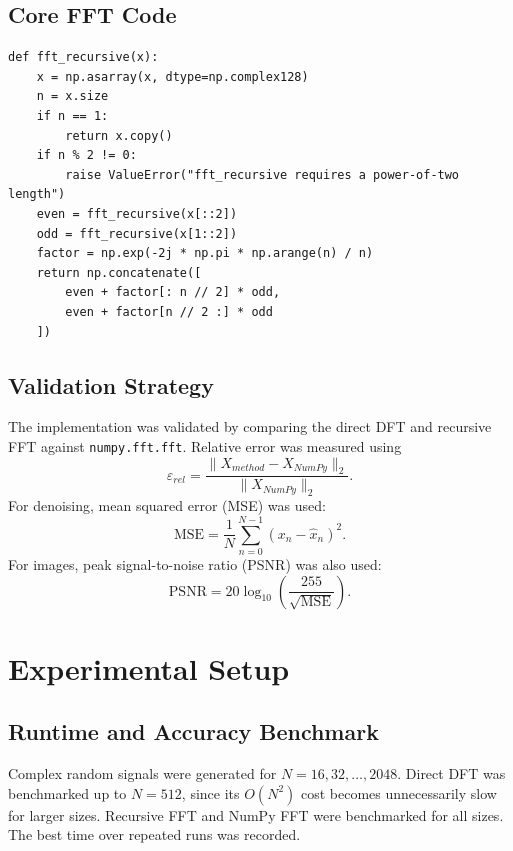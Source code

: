 \documentclass{zc-ust-hw}
\begin{document}
\subsection{Core FFT Code}
\begin{lstlisting}[caption={Recursive Cooley--Tukey FFT implementation used in the experiments.}]
def fft_recursive(x):
    x = np.asarray(x, dtype=np.complex128)
    n = x.size
    if n == 1:
        return x.copy()
    if n % 2 != 0:
        raise ValueError("fft_recursive requires a power-of-two length")
    even = fft_recursive(x[::2])
    odd = fft_recursive(x[1::2])
    factor = np.exp(-2j * np.pi * np.arange(n) / n)
    return np.concatenate([
        even + factor[: n // 2] * odd,
        even + factor[n // 2 :] * odd
    ])
\end{lstlisting}

\subsection{Validation Strategy}
The implementation was validated by comparing the direct DFT and recursive FFT against \texttt{numpy.fft.fft}. Relative error was measured using
\begin{equation}
\varepsilon_{rel}=\frac{\|X_{method}-X_{NumPy}\|_2}{\|X_{NumPy}\|_2}.
\end{equation}
For denoising, mean squared error (MSE) was used:
\begin{equation}
\mathrm{MSE}=\frac{1}{N}\sum_{n=0}^{N-1}(x_n-\widehat{x}_n)^2.
\end{equation}
For images, peak signal-to-noise ratio (PSNR) was also used:
\begin{equation}
\mathrm{PSNR}=20\log_{10}\left(\frac{255}{\sqrt{\mathrm{MSE}}}\right).
\end{equation}

\section{Experimental Setup}
\subsection{Runtime and Accuracy Benchmark}
Complex random signals were generated for \(N=16,32,\dots,2048\). Direct DFT was benchmarked up to \(N=512\), since its \(O(N^2)\) cost becomes unnecessarily slow for larger sizes. Recursive FFT and NumPy FFT were benchmarked for all sizes. The best time over repeated runs was recorded.
\end{document}
